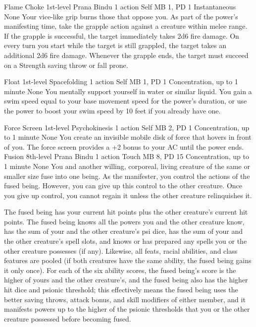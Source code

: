 \DndPowerHeader%
    {Flame Choke\label{pwr:flame_choke}}
    {1st-level Prana Bindu}
    {1 action}
    {Self}
    {MB 1, PD 1}
    {Instantaneous}
    {None}
Your vice-like grip burns those that oppose
you. As part of the power's manifesting time, take the grapple
action against a creature within melee range. If the grapple
is successful, the target immediately takes 2d6 fire damage.
On every turn you start while the target is still grappled,
the target takes an additional 2d6 fire damage. Whenever the
grapple ends, the target must succeed on a Strength saving
throw or fall prone.

\DndPowerHeader%
    {Float\label{pwr:float}}
    {1st-level Spacefolding}
    {1 action}
    {Self}
    {MB 1, PD 1}
    {Concentration, up to 1 minute}
    {None}
You mentally support yourself in water or
similar liquid. You gain a swim speed equal to your base movement
speed for the power's duration, or use the power to boost
your swim speed by 10 feet if you already have one.

\DndPowerHeader%
    {Force Screen\label{pwr:force_screen}}
    {1st-level Psychokinesis}
    {1 action}
    {Self}
    {MB 2, PD 1}
    {Concentration, up to 1 minute}
    {None}
You create an invisible mobile disk of force
that hovers in front of you. The force screen provides a +2
bonus to your AC until the power ends.
\DndPowerHeader%
    {Fusion\label{pwr:fusion}}
    {8th-level Prana Bindu}
    {1 action}
    {Touch}
    {MB 8, PD 15}
    {Concentration, up to 1 minute}
    {None}
You and another willing, corporeal, living
creature of the same or smaller size fuse into one being.
As the manifester, you control the actions of the fused being.
However, you can give up this control to the other creature.
Once you give up control, you cannot regain it unless the
other creature relinquishes it.

The fused being has your current hit points plus the other
creature's current hit points. The fused being knows all
the powers you and the other creature know, has the sum of
your and the other creature's psi dice, has the sum of your
and the other creature's spell slots, and knows or has prepared
any spells you or the other creature possesses (if any). Likewise,
all feats, racial abilities, and class features are pooled
(if both creatures have the same ability, the fused being
gains it only once). For each of the six ability scores, the
fused being's score is the higher of yours and the other
creature's, and the fused being also has the higher hit dice
and psionic threshold; this effectively means the fused being
uses the better saving throws, attack bonus, and skill modifiers
of either member, and it manifests powers up to the higher
of the psionic thresholds that you or the other creature possessed
before becoming fused.

